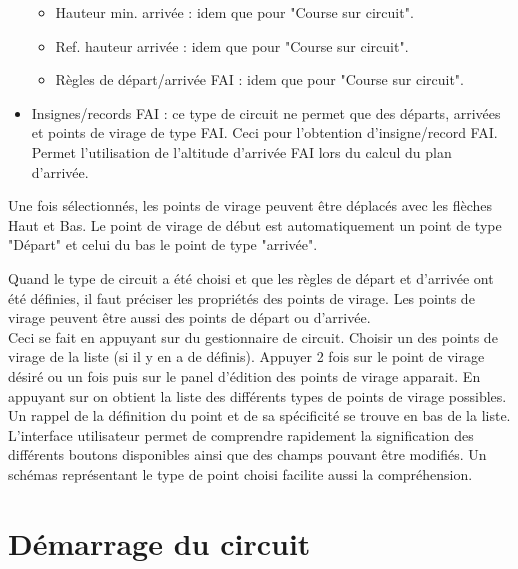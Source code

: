 \begin{itemize}
\begin{itemize}
  \item Hauteur min. arrivée : idem que pour "Course sur circuit".
  \item Ref. hauteur arrivée : idem que pour "Course sur circuit".
   \item Règles de départ/arrivée FAI : idem que pour "Course sur circuit".
 \end{itemize}
\item Insignes/records FAI :  ce type de circuit ne permet que des départs, arrivées et points de virage de type FAI. Ceci pour l'obtention d'insigne/record FAI. Permet l'utilisation de l'altitude d'arrivée FAI lors du calcul du plan d'arrivée.
\end{itemize}

Une fois sélectionnés, les points de virage peuvent être déplacés avec les flèches Haut et Bas. Le point de virage de début est automatiquement un point de type "Départ" et celui du bas le point de type "arrivée".

Quand le type de circuit a été choisi et que les règles de départ et d'arrivée ont été définies, il faut préciser les propriétés des points de virage. Les points de virage peuvent être aussi des points de départ ou d'arrivée.\\
Ceci se fait en appuyant sur   du gestionnaire de circuit. Choisir un des points de virage de la liste (si il y en a de définis). Appuyer 2 fois sur le point de virage désiré ou un fois puis sur  le panel d'édition des points de virage apparait. En appuyant sur   on obtient la liste des différents types de points de virage possibles. Un rappel de la définition du point et de sa spécificité se trouve en bas de la liste. 
L'interface utilisateur permet de comprendre rapidement la signification des différents boutons disponibles ainsi que des champs pouvant être modifiés. Un schémas représentant le type de point choisi facilite aussi la compréhension. 

\section{Démarrage du circuit}\label{sec:demarrage-circuit}


